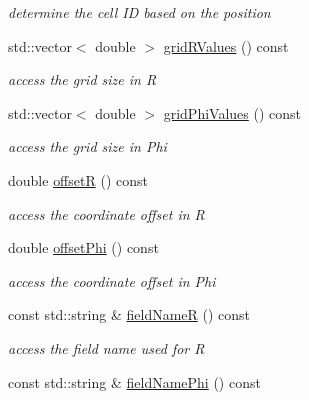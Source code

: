 \begin{DoxyCompactItemize}
\begin{DoxyCompactList}\small\item\em determine the cell ID based on the position \item\end{DoxyCompactList}\item 
std::vector$<$ double $>$ \hyperlink{class_d_d4hep_1_1_d_d_segmentation_1_1_polar_grid_r_phi2_ad0fa4b4b84d24247dc74fc4602619ba8}{gridRValues} () const 
\begin{DoxyCompactList}\small\item\em access the grid size in R \item\end{DoxyCompactList}\item 
std::vector$<$ double $>$ \hyperlink{class_d_d4hep_1_1_d_d_segmentation_1_1_polar_grid_r_phi2_af4f179409116da086b120f46ab3433ec}{gridPhiValues} () const 
\begin{DoxyCompactList}\small\item\em access the grid size in Phi \item\end{DoxyCompactList}\item 
double \hyperlink{class_d_d4hep_1_1_d_d_segmentation_1_1_polar_grid_r_phi2_a7df4f48eab7247dc4b8f0b1fc1b464d8}{offsetR} () const 
\begin{DoxyCompactList}\small\item\em access the coordinate offset in R \item\end{DoxyCompactList}\item 
double \hyperlink{class_d_d4hep_1_1_d_d_segmentation_1_1_polar_grid_r_phi2_a2a77b6a183ab9fa40e0001f4ac723cf7}{offsetPhi} () const 
\begin{DoxyCompactList}\small\item\em access the coordinate offset in Phi \item\end{DoxyCompactList}\item 
const std::string \& \hyperlink{class_d_d4hep_1_1_d_d_segmentation_1_1_polar_grid_r_phi2_a95ef3314ebba93b87f5a508efb2e7066}{fieldNameR} () const 
\begin{DoxyCompactList}\small\item\em access the field name used for R \item\end{DoxyCompactList}\item 
const std::string \& \hyperlink{class_d_d4hep_1_1_d_d_segmentation_1_1_polar_grid_r_phi2_a4c0c6f5fc47520801723c337224e546d}{fieldNamePhi} () const 

\end{DoxyCompactItemize}
